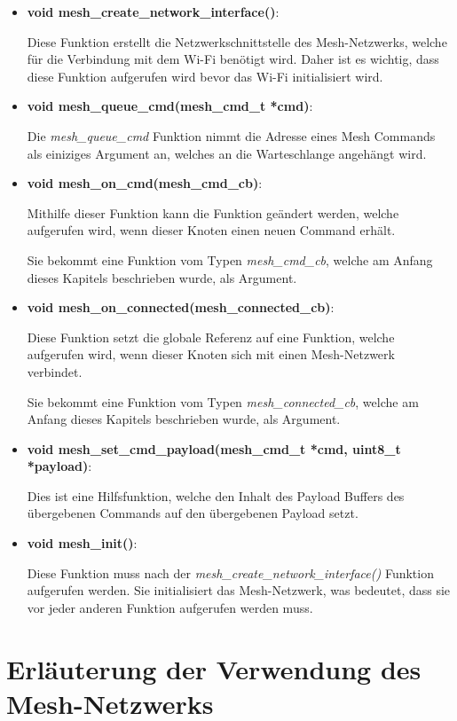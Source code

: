 \begin{itemize}
    \item \textbf{void mesh\_create\_network\_interface()}:
    
    Diese Funktion erstellt die Netzwerkschnittstelle des Mesh-Netzwerks, welche für die Verbindung mit dem Wi-Fi benötigt wird. Daher ist es wichtig, dass diese Funktion aufgerufen wird bevor das Wi-Fi initialisiert wird.

    \item \textbf{void mesh\_queue\_cmd(mesh\_cmd\_t *cmd)}:

    Die \textit{mesh\_queue\_cmd} Funktion nimmt die Adresse eines Mesh Commands als einiziges Argument an, welches an die Warteschlange angehängt wird. 

    \item \textbf{void mesh\_on\_cmd(mesh\_cmd\_cb)}:
    
    Mithilfe dieser Funktion kann die Funktion geändert werden, welche aufgerufen wird, wenn dieser Knoten einen neuen Command erhält.

    Sie bekommt eine Funktion vom Typen \textit{mesh\_cmd\_cb}, welche am Anfang dieses Kapitels beschrieben wurde, als Argument.

    \item \textbf{void mesh\_on\_connected(mesh\_connected\_cb)}:
    
    Diese Funktion setzt die globale Referenz auf eine Funktion, welche aufgerufen wird, wenn dieser Knoten sich mit einen Mesh-Netzwerk verbindet.
    
    Sie bekommt eine Funktion vom Typen \textit{mesh\_connected\_cb}, welche am Anfang dieses Kapitels beschrieben wurde, als Argument.

    \item \textbf{void mesh\_set\_cmd\_payload(mesh\_cmd\_t *cmd, uint8\_t *payload)}:
    
    Dies ist eine Hilfsfunktion, welche den Inhalt des Payload Buffers des übergebenen Commands auf den übergebenen Payload setzt.

    \item \textbf{void mesh\_init()}:
    
    Diese Funktion muss nach der \textit{mesh\_create\_network\_interface()} Funktion aufgerufen werden. Sie initialisiert das Mesh-Netzwerk, was bedeutet, dass sie vor jeder anderen Funktion aufgerufen werden muss.
\end{itemize}

\section{Erläuterung der Verwendung des Mesh-Netzwerks}

